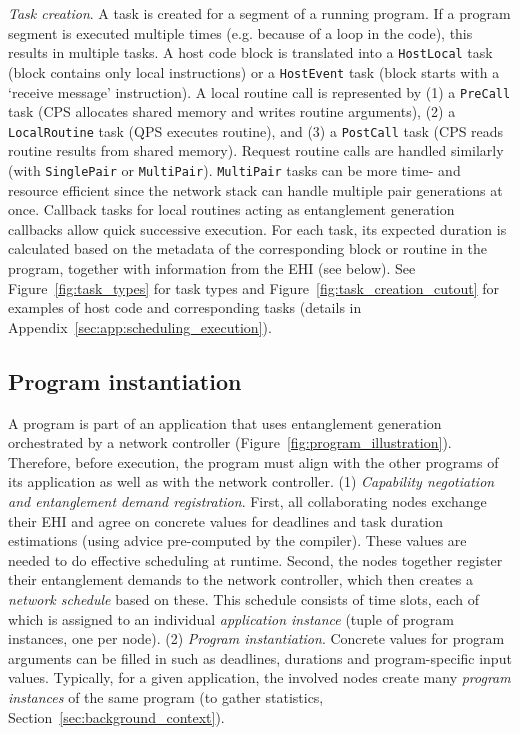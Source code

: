 \textit{Task creation}. 
A task is created for a segment of a running program.
If a program segment is executed multiple times (e.g. because of a loop in the code), this results in multiple tasks.
A host code block is translated into a \texttt{HostLocal} task (block contains only local instructions) or a \texttt{HostEvent} task (block starts with a `receive message' instruction).
A local routine call is represented by (1) a \texttt{PreCall} task (CPS allocates shared memory and writes routine arguments), (2) a \texttt{LocalRoutine} task (QPS executes routine), and (3) a \texttt{PostCall} task (CPS reads routine results from shared memory).
Request routine calls are handled similarly (with \texttt{SinglePair} or \texttt{MultiPair}).
\texttt{MultiPair} tasks can be more time- and resource efficient since the network stack can handle multiple pair generations at once.
Callback tasks for local routines acting as entanglement generation callbacks allow quick successive execution.
For each task, its expected duration is calculated based on the metadata of the corresponding block or routine in the program, together with information from the EHI (see below).
See Figure~\ref{fig:task_types} for task types and Figure~\ref{fig:task_creation_cutout} for examples of host code and corresponding tasks (details in Appendix~\ref{sec:app:scheduling_execution}).


\subsection{Program instantiation}
\label{sec:program_instantiation}
A program is part of an application that uses entanglement generation orchestrated by a network controller (Figure~\ref{fig:program_illustration}).
Therefore, before execution, the program must align with the other programs of its application as well as with the network controller.
(1) \textit{Capability negotiation and entanglement demand registration}.
First, all collaborating nodes exchange their EHI and agree on concrete values for deadlines and task duration estimations (using advice pre-computed by the compiler).
These values are needed to do effective scheduling at runtime.
Second, the nodes together register their entanglement demands to the network controller, which then creates a \textit{network schedule} based on these.
This schedule consists of time slots, each of which is assigned to an individual \textit{application instance} (tuple of program instances, one per node).
(2) \textit{Program instantiation}. Concrete values for program arguments can be filled in such as deadlines, durations and program-specific input values.
Typically, for a given application, the involved nodes create many \textit{program instances} of the same program (to gather statistics, Section~\ref{sec:background_context}).


